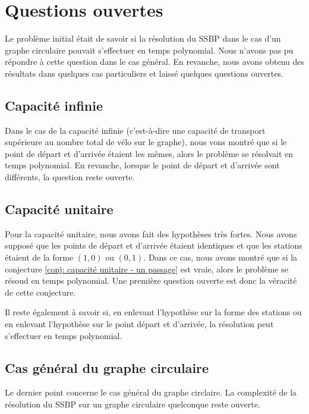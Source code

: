 \chapter{Questions ouvertes}

Le problème initial était de savoir si la résolution du SSBP dans le cas d'un graphe circulaire pouvait s'effectuer en temps polynomial. Nous n'avons pas pu répondre à cette question dans le cas général. En revanche, nous avons obtenu des résultats dans quelques cas particuliers et laissé quelques questions ouvertes.

\section{Capacité infinie}

Dans le cas de la capacité infinie (c'est-à-dire une capacité de transport supérieure au nombre total de vélo sur le graphe), nous vons montré que si le point de départ et d'arrivée étaient les mêmes, alors le problème se résolvait en temps polynomial. En revanche, lorsque le point de départ et d'arrivée sont différents, la question reste ouverte.

\section{Capacité unitaire}

Pour la capacité unitaire, nous avons fait des hypothèses très fortes. Nous avons supposé que les points de départ et d'arrivée étaient identiques et que les stations étaient de la forme $(1,0)$ ou $(0,1)$. Dans ce cas, nous avons montré que si la conjecture \ref{conj: capacité unitaire - un passage} est vraie, alors le problème se résoud en temps polynomial. Une première question ouverte est donc la véracité de cette conjecture.

Il reste également à savoir si, en enlevant l'hypothèse sur la forme des stations ou en enlevant l'hypothèse sur le point départ et d'arrivée, la résolution peut s'effectuer en temps polynomial.

\section{Cas général du graphe circulaire}

Le dernier point concerne le cas général du graphe circlaire. La complexité de la résolution du SSBP sur un graphe circulaire quelconque reste ouverte.